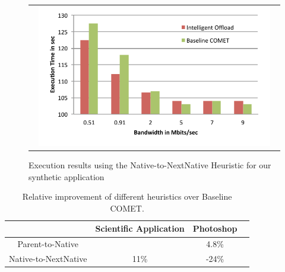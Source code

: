 \begin{figure} [thf*]
\centering
\begin{tabular}{c}
\begin{minipage}[b]{0.5\textwidth}
\includegraphics[width=0.95\textwidth]{figs/h2_sweep.pdf}
\end{minipage}
\end{tabular}
\caption{Execution results using the Native-to-NextNative Heuristic for our synthetic application}
\label{fig:h2_sweep}
\end{figure}

\begin{table}[tbh]
{\small
\centering
\begin{minipage}{0.45\textwidth}
\centering
\begin{tabular}{|c|c|c|c|}
\hline
& Scientific Application & Photoshop \\
\hline
\hline
Parent-to-Native &  & 4.8\% \\ \hline
\hline
Native-to-NextNative & 11\%  & -24\%  \\ \hline
 \end{tabular}
\end{minipage}
\caption{Relative improvement of different heuristics over Baseline COMET. }
\label{table:heuristic}
\vspace{-6mm}
}
\end{table}




